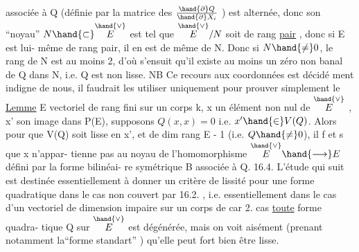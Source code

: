 
associée à Q (définie par la matrice des $\frac{\hand{\partial} Q}{\hand{\partial} X_i}$ ) est alternée, donc son
``noyau''  $N\hand{\subset}\overset{\hand{\vee}}{E}$  est tel que  $\overset{\hand{\vee}}{E}/N$  soit de rang \uline{pair} , donc si E est lui-%
même de rang pair, il en est de même de N. Donc si $N\hand{\neq} 0$, le rang de N
est au moins 2, d'où s'ensuit qu'il existe au moins un zéro non banal de
Q dans N, i.e. Q est non lisse.  NB Ce recours aux coordonnées est décidé
ment indigne de nous, il faudrait les utiliser uniquement pour prouver
simplement le
\uline{Lemme}  E vectoriel de rang fini sur un corps k,  x un élément non nul de
$\overset{\hand{\vee}}{E}$ ,  x' son image dans P(E), supposons  $Q(x,x) = 0$ i.e.
$x'\hand{\in} V(Q)$. Alors pour que  V(Q) soit lisse en x',
et de dim  rang E - 1   (i.e. $Q\hand{\neq} 0$), il f et s  que x n'appar-%
tienne pas au noyau de l'homomorphisme $\overset{\hand{\vee}}{E}\hand{\longrightarrow} E$ défini par la forme bilinéai-%
re symétrique B associée à Q\hand{/}.
16.4.  L'étude qui suit est destinée essentiellement à 
donner un critère de lissité pour une forme quadratique dans le cas non
couvert par 16.2. , i.e. essentiellement dans le cas d'un vectoriel de
dimension impaire sur un corps de car 2.  cas \uline{toute} forme quadra-%
tique  Q  sur $\overset{\hand{\vee}}{E}$ est dégénérée, mais on voit aisément (prenant notamment
la``forme standart'' ) qu'elle peut fort bien être lisse.

